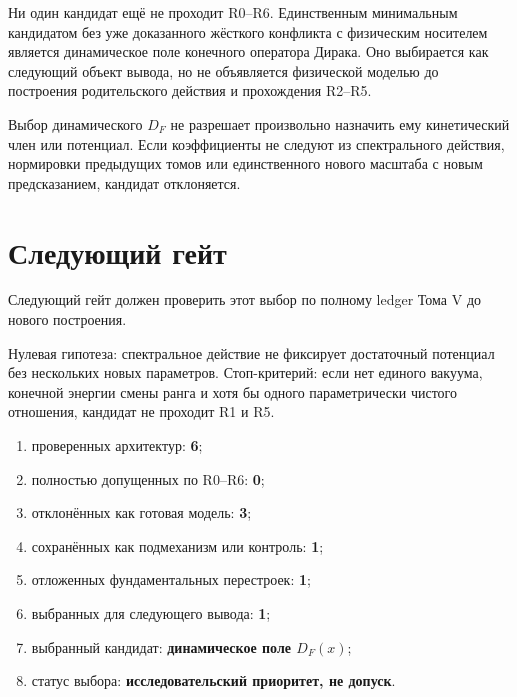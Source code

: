 \begin{theorem}
Ни один кандидат ещё не проходит R0--R6. Единственным минимальным
кандидатом без уже доказанного жёсткого конфликта с физическим носителем
является динамическое поле конечного оператора Дирака. Оно выбирается как
следующий объект вывода, но не объявляется физической моделью до построения
родительского действия и прохождения R2--R5.
\end{theorem}

\begin{nogocriterion}
Выбор динамического $D_F$ не разрешает произвольно назначить ему
кинетический член или потенциал. Если коэффициенты не следуют из
спектрального действия, нормировки предыдущих томов или единственного
нового масштаба с новым предсказанием, кандидат отклоняется.
\end{nogocriterion}

\section{Следующий гейт}

Следующий гейт
должен проверить этот выбор по полному ledger Тома V до нового построения.

Нулевая гипотеза: спектральное действие не фиксирует достаточный потенциал
без нескольких новых параметров. Стоп-критерий: если нет единого вакуума,
конечной энергии смены ранга и хотя бы одного параметрически чистого
отношения, кандидат не проходит R1 и R5.

\begin{protocol}
\begin{enumerate}
 \item проверенных архитектур: \textbf{6};
 \item полностью допущенных по R0--R6: \textbf{0};
 \item отклонённых как готовая модель: \textbf{3};
 \item сохранённых как подмеханизм или контроль: \textbf{1};
 \item отложенных фундаментальных перестроек: \textbf{1};
 \item выбранных для следующего вывода: \textbf{1};
 \item выбранный кандидат: \textbf{динамическое поле $D_F(x)$};
 \item статус выбора: \textbf{исследовательский приоритет, не допуск}.
\end{enumerate}
\end{protocol}

